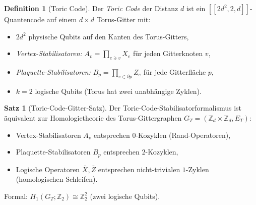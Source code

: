 ﻿\documentclass[a4paper,12pt]{article}
\theoremstyle{definition}
\newtheorem{definition}{Definition}
\newtheorem{satz}{Satz}
\begin{document}
\begin{definition}[Toric Code]
\label{def:toric}
Der \emph{Toric Code} der Distanz $d$ ist ein $[[2d^2, 2, d]]$-Quantencode
auf einem $d \times d$ Torus-Gitter mit:
\begin{itemize}
    \item $2d^2$ physische Qubits auf den Kanten des Torus-Gitters,
    \item \emph{Vertex-Stabilisatoren:} $A_v = \prod_{e \ni v} X_e$
          f\"ur jeden Gitterknoten $v$,
    \item \emph{Plaquette-Stabilisatoren:} $B_p = \prod_{e \in \partial p} Z_e$
          f\"ur jede Gitterfl\"ache $p$,
    \item $k = 2$ logische Qubits (Torus hat zwei unabh\"angige Zyklen).
\end{itemize}
\end{definition}

\begin{satz}[Toric-Code-Gitter-Satz]
\label{satz:toric_graph}
Der Toric-Code-Stabilisatorformalismus ist \"aquivalent zur Homologietheorie
des Torus-Gittergraphen $G_T = (\mathbb{Z}_d \times \mathbb{Z}_d, E_T)$:
\begin{itemize}
    \item Vertex-Stabilisatoren $A_v$ entsprechen $0$-Kozyklen (Rand-Operatoren),
    \item Plaquette-Stabilisatoren $B_p$ entsprechen $2$-Kozyklen,
    \item Logische Operatoren $\bar{X}, \bar{Z}$ entsprechen nicht-trivialen
          $1$-Zyklen (homologischen Schleifen).
\end{itemize}
Formal: $H_1(G_T; \mathbb{Z}_2) \cong \mathbb{Z}_2^2$ (zwei logische Qubits).
\end{satz}
\end{document}
